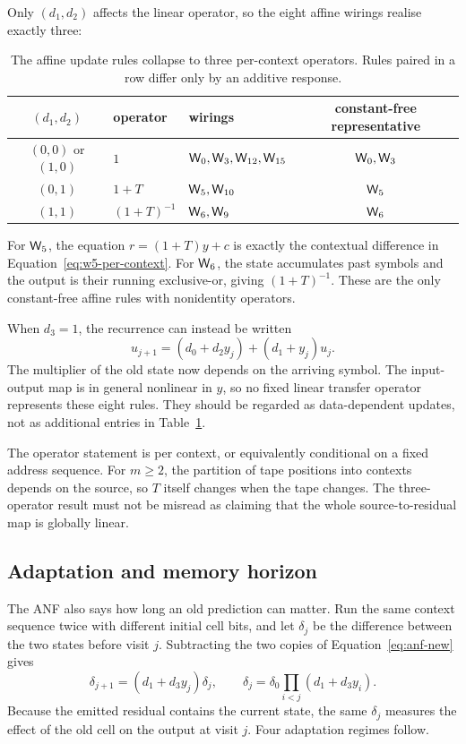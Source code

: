 Only $(d_1,d_2)$ affects the linear operator, so the eight affine wirings realise exactly three:
\begin{table}[ht]
\centering\small
\begin{tabular}{@{}cllc@{}}
\toprule
$(d_1,d_2)$ & operator & wirings & constant-free representative\\
\midrule
$(0,0)$ or $(1,0)$ & $1$ & $\mathsf{W}_{0},\mathsf{W}_{3},\mathsf{W}_{12},\mathsf{W}_{15}$ & $\mathsf{W}_{0},\mathsf{W}_{3}$\\
$(0,1)$ & $1+T$ & $\mathsf{W}_{5},\mathsf{W}_{10}$ & $\mathsf{W}_{5}$\\
$(1,1)$ & $(1+T)^{-1}$ & $\mathsf{W}_{6},\mathsf{W}_{9}$ & $\mathsf{W}_{6}$\\
\bottomrule
\end{tabular}
\caption{The affine update rules collapse to three per-context operators.  Rules paired in a row
differ only by an additive response.}
\label{tab:operators-new}
\end{table}

For $\mathsf{W}_{5}$, the equation $r=(1+T)y+c$ is exactly the contextual difference in
Equation~\eqref{eq:w5-per-context}.  For $\mathsf{W}_{6}$, the state accumulates past symbols and the output
is their running exclusive-or, giving $(1+T)^{-1}$.  These are the only constant-free affine
rules with nonidentity operators.

When $d_3=1$, the recurrence can instead be written
\begin{equation}\label{eq:nonaffine-recurrence}
  u_{j+1}=(d_0+d_2y_j)+(d_1+y_j)u_j .
\end{equation}
The multiplier of the old state now depends on the arriving symbol.  The input-output map is in
general nonlinear in $y$, so no fixed linear transfer operator represents these eight rules.
They should be regarded as data-dependent updates, not as additional entries in
Table~\ref{tab:operators-new}.

The operator statement is per context, or equivalently conditional on a fixed address sequence.
For $m\ge2$, the partition of tape positions into contexts depends on the source, so $T$ itself
changes when the tape changes.  The three-operator result must not be misread as claiming that the
whole source-to-residual map is globally linear.

\subsection{Adaptation and memory horizon}

The ANF also says how long an old prediction can matter.  Run the same context sequence twice
with different initial cell bits, and let $\delta_j$ be the difference between the two states
before visit $j$.  Subtracting the two copies of Equation~\eqref{eq:anf-new} gives
\begin{equation}\label{eq:delta-horizon}
  \delta_{j+1}=(d_1+d_3y_j)\delta_j,
  \qquad
  \delta_j=\delta_0\prod_{i<j}(d_1+d_3y_i).
\end{equation}
Because the emitted residual contains the current state, the same $\delta_j$ measures the effect
of the old cell on the output at visit $j$.  Four adaptation regimes follow.


